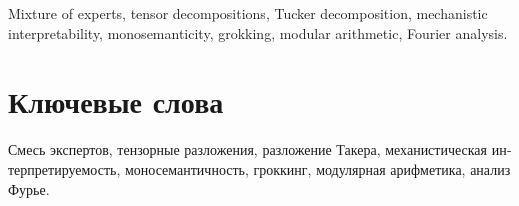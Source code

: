 \documentclass[a4paper,12pt]{extarticle}
\begin{document}
Mixture of experts, tensor decompositions, Tucker decomposition, mechanistic
interpretability, monosemanticity, grokking, modular arithmetic, Fourier
analysis.

\section*{\foreignlanguage{russian}{Ключевые слова}}
\foreignlanguage{russian}{
Смесь экспертов, тензорные разложения, разложение Такера, механистическая
интерпретируемость, моносемантичность, гроккинг, модулярная арифметика,
анализ Фурье.
}

\pagebreak









\newpage
\printbibliography[heading=bibintoc]

\newpage
\appendix

\end{document}
